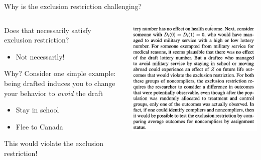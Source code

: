 \documentclass[notes,11pt, aspectratio=169]{beamer}
\newenvironment{wideitemize}{\itemize\addtolength{\itemsep}{10pt}}{\enditemize}
\begin{document}
\begin{frame}{Why is the exclusion restriction challenging?}
  \begin{columns}[T] %
    \begin{column}{0.6\textwidth}
      \begin{wideitemize}
      \item Does that necessarily satisfy exclusion restriction? 
        \begin{itemize}
        \item Not necessarily!
        \end{itemize}
      \item Why? Consider one simple example: being drafted induces
        you to change your behavior to \emph{avoid} the draft
        \begin{itemize}
        \item Stay in school
        \item Flee to Canada
        \end{itemize}
      \item This would violate the exclusion restriction!
  \end{wideitemize}
\end{column}
\begin{column}{0.4\textwidth}
  \includegraphics[width=\linewidth]{images/jasab.png}
\end{column}
\end{columns}
\end{frame}
\end{document}
